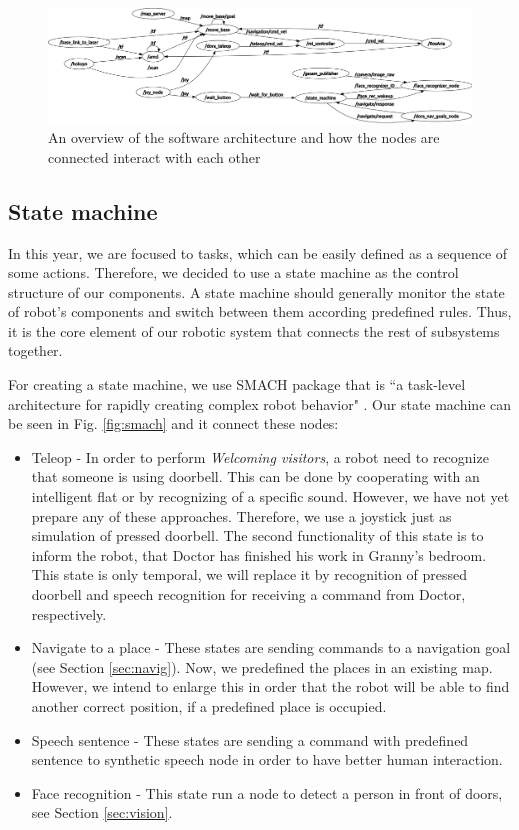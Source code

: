 \documentclass[conference]{IEEEtran}
\begin{document}
\begin{figure}[!t]
\centering
\includegraphics[width=\textwidth]{nodes_cut.png}
\caption{An overview of the software architecture and how the nodes are connected interact with each other}
\label{fig:nodes}
\end{figure}

\subsection{State machine}
In this year, we are focused to tasks, which can be easily defined as a sequence of some actions. Therefore, we decided to use a state machine as the control structure of our components. A state machine should generally monitor the state of robot's components and switch between them according predefined rules. Thus, it is the core element of our robotic system that connects the rest of subsystems together.

For creating a state machine, we use SMACH package that is ``a task-level architecture for rapidly creating complex robot behavior" \cite{smach}. Our state machine can be seen in Fig. \ref{fig:smach} and it connect these nodes:
\begin{itemize}
\item Teleop - In order to perform \textit{Welcoming visitors}, a robot need to recognize that someone is using doorbell. This can be done by cooperating with an intelligent flat or by recognizing of a specific sound. However, we have not yet prepare any of these approaches. Therefore, we use a joystick just as simulation of pressed doorbell. 
The second functionality of this state is to inform the robot, that Doctor has finished his work in Granny's bedroom. This state is only temporal, we will replace it by recognition of pressed doorbell and speech recognition for receiving a command from Doctor, respectively.
\item Navigate to a place - These states are sending commands to a navigation goal (see Section \ref{sec:navig}). Now, we predefined the places in an existing map. However, we intend to enlarge this in order that the robot will be able to find another correct position, if a predefined place is occupied.
\item Speech sentence - These states are sending a command with predefined sentence to synthetic speech node in order to have better human interaction.
\item Face recognition - This state run a node to detect a person in front of doors, see Section \ref{sec:vision}.
\end{itemize}
\end{document}
